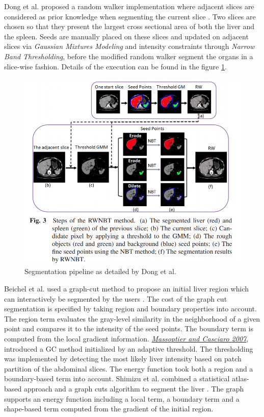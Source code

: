 \documentclass[]{article}
\begin{document}
	Dong et al. proposed a random walker implementation where adjacent slices are
	considered as prior knowledge when segmenting the current slice \cite{Dong2016}. Two
	slices are chosen so that they present the largest cross sectional area
	of both the liver and the spleen. Seeds are manually placed on these
	slices and updated on adjacent slices via \emph{Gaussian Mixtures
		Modeling} and intensity constraints through \emph{Narrow Band
		Thresholding}, before the modified random walker segment the organs in a
	slice-wise fashion. Details of the execution can be found in the figure
	\ref{Dong2016_Fig3}.
	
	\begin{figure}[th!]
		\centering
		\includegraphics[width=0.7\linewidth]{images/image14}
		\caption{Segmentation pipeline as detailed by Dong et al. \cite{Dong2016}}
		\label{Dong2016_Fig3}
	\end{figure}
	
	
	Beichel et al. used a graph-cut method to propose an initial liver
	region which can interactively be segmented by the users \cite{Beichel2007}. The cost of
	the graph cut segmentation is specified by taking region and boundary
	properties into account. The region term evaluates the gray-level
	similarity in the neighborhood of a given point and compares it to the
	intensity of the seed points. The boundary term is computed from the
	local gradient information.
	\href{https://www.researchgate.net/publication/5844188_Fully_Automatic_Liver_Segmentation_through_Graph-Cut_Technique}{\emph{Massoptier
			and Casciaro 2007}}, introduced a GC method initialized by an adaptive
	threshold. The thresholding was implemented by detecting the most likely
	liver intensity based on patch partition of the abdominal slices. The
	energy function took both a region and a boundary-based term into
	account.
	Shimizu et al. combined a statistical atlas-based approach and a graph
	cuts algorithm to segment the liver \cite{Shimizu2011}. The graph supports an energy
	function including a local term, a boundary term and a shape-based term
	computed from the gradient of the initial region.
	
\end{document}
